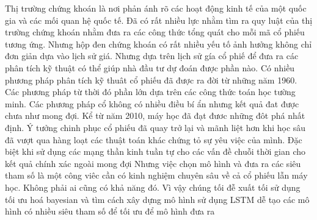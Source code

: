 Thị trường chứng khoán là nơi phản ánh rõ các hoạt động kinh tế của một quốc gia và các mối quan hệ quốc tế. Đã có rất nhiều
lực nhằm tìm ra quy luật của thị trường chứng khoán nhằm đưa ra các công thức tổng quát cho mỗi mã cổ phiếu tương ứng.
Nhưng hộp đen chứng khoán có rất nhiều yếu tố ảnh hưởng không chỉ đơn giản dựa vào lịch sử giá. Nhưng dựa trên lịch sử gía cổ phiế
để đưa ra các phân tích kỹ thuật có thể giúp nhà đầu tư dự đoán được phần nào.
Có nhiều phương pháp phân tích kỹ thuât cổ phiếu đã được ra đời từ những năm 1960. Các phương pháp từ thời đó phần lớn dựa trên các công thức toán học tường minh.
Các phương pháp cổ không có nhiều điều bí ẩn nhưng kết quả đat được chưa như mong đợi.
Kể từ năm 2010, máy học đã đạt đươc những đôt phá nhất định. Ý tưởng chinh phục cổ phiếu đã quay trở lại và mãnh liệt hơn khi học sâu đã vượt qua hàng loạt các thuật toán khác chứng tỏ sự yêu việc của mình. Đặc biệt khi sử dụng các mạng thần kinh tuần tự cho các vấn đề chuỗi thời gian cho kết quả chính xác ngoài mong đợi
Nhưng việc chọn mô hình và đưa ra các siêu tham số là một công viêc cần có kinh nghiệm chuyên sâu về cả cổ phiếu lẫn máy học. 
Không phải ai cũng có khả năng đó. Vì vậy chúng tối đễ xuất tối sử dụng tối ưu hoá bayesian và tìm cách xây dựng mô hình sử dụng LSTM dễ tạo các mô hình có nhiều siêu tham số để tối ưu để mô hình đưa ra